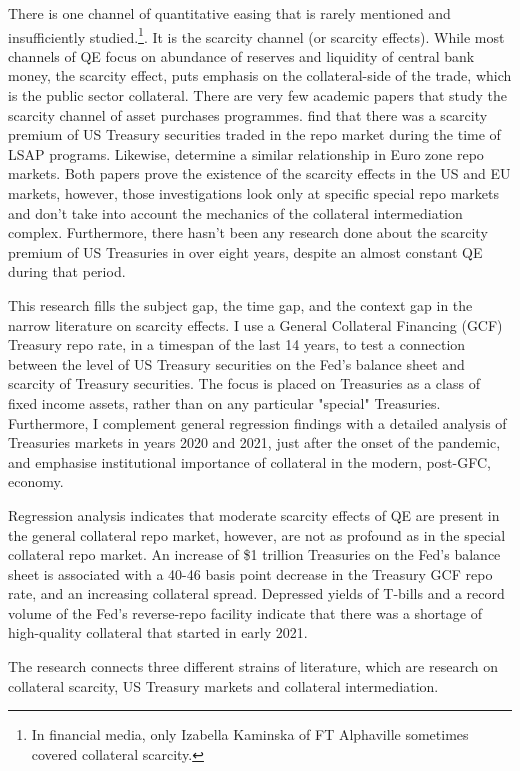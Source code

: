 \documentclass[11pt,a4paper,english,oneside]{article}
\begin{document}
There is one channel of quantitative easing that is rarely mentioned and insufficiently studied.\footnote{In financial media, only Izabella Kaminska of FT Alphaville sometimes covered collateral scarcity.}. It is the scarcity channel (or scarcity effects). While most channels of QE focus on abundance of reserves and liquidity of central bank money, the scarcity effect, puts emphasis on the collateral-side of the trade, which is the public sector collateral. There are very few academic papers that study the scarcity channel of asset purchases programmes. \citet{damico2014} find that there was a scarcity premium of US Treasury securities traded in the repo market during the time of LSAP programs. Likewise, \citet{arrata2018} determine a similar relationship in Euro zone repo markets. Both papers prove the existence of the scarcity effects in the US and EU markets, however, those investigations look only at specific special repo markets and don't take into account the mechanics of the collateral intermediation complex. Furthermore, there hasn't been any research done about the scarcity premium of US Treasuries in over eight years, despite an almost constant QE during that period.

This research fills the subject gap, the time gap, and the context gap in the narrow literature on scarcity effects. I use a General Collateral Financing (GCF) Treasury repo rate, in a timespan of the last 14 years, to test a connection between the level of US Treasury securities on the Fed's balance sheet and scarcity of Treasury securities. The focus is placed on Treasuries as a class of fixed income assets, rather than on any particular "special" Treasuries. Furthermore, I complement general regression findings with a detailed analysis of Treasuries markets in years 2020 and 2021, just after the onset of the pandemic, and emphasise institutional importance of collateral in the modern, post-GFC, economy.

Regression analysis indicates that moderate scarcity effects of QE are present in the general collateral repo market, however, are not as profound as in the special collateral repo market. An increase of \$1 trillion Treasuries on the Fed's balance sheet is associated with a 40-46 basis point decrease in the Treasury GCF repo rate, and an increasing collateral spread. Depressed yields of T-bills and a record volume of the Fed's reverse-repo facility indicate that there was a shortage of high-quality collateral that started in early 2021.

The research connects three different strains of literature, which are research on collateral scarcity, US Treasury markets and collateral intermediation.
\end{document}
